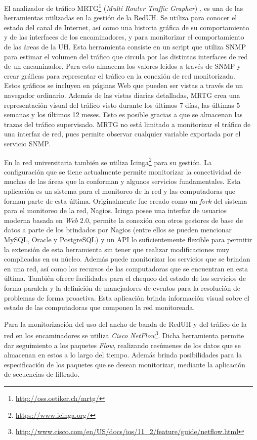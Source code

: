 El analizador de tráfico MRTG\footnote{\url{http://oss.oetiker.ch/mrtg/}}
(\emph{Multi Router Traffic Grapher})\cite{Prunoiu} , es una de las herramientas
utilizadas en la gestión de la RedUH. Se utiliza para conocer el estado del
canal de Internet, así como una historia gráfica de su comportamiento y de las
interfaces de los encaminadores, y para monitorizar el comportamiento de las
áreas de la UH. Esta herramienta consiste en un script que utiliza SNMP para
estimar el volumen del tráfico que circula por las distintas interfaces de red
de un encaminador. Para esto almacena los valores leídos a través de SNMP y
crear gráficas para representar el tráfico en la conexión de red monitorizada.
Estos gráficos se incluyen en páginas Web que pueden ser vistas a través de un
navegador ordinario. Además de las vistas diarias detalladas, MRTG crea una
representación visual del tráfico visto durante los últimos 7 días, las últimas
5 semanas y los últimos 12 meses. Esto es posible gracias a que se almacenan las
trazas del tráfico supervisado. MRTG no está limitado a monitorizar el tráfico
de una interfaz de red, pues permite observar cualquier variable exportada por
el servicio SNMP\cite{Hardaker2011}.

En la red universitaria también se utiliza Icinga\footnote{\url{https://www.icinga.org/}} para su gestión. La
configuración que se tiene actualmente permite monitorizar la conectividad de
muchas de las áreas que la conforman y algunos servicios fundamentales. Esta
aplicación es un sistema para el monitoreo de la red y las computadoras que
forman parte de esta última. Originalmente fue creado como un \textit{fork} del
sistema para el monitoreo de la red, Nagios. Icinga posee una interfaz de
usuarios moderna basada en \textit{Web} 2.0, permite la conexión con otros
gestores de base de datos a parte de los brindados por Nagios (entre ellos se
pueden mencionar MySQL, Oracle y PostgreSQL) y un API lo suficientemente
flexible para permitir la extensión de esta herramienta sin tener que realizar
modificaciones muy complicadas en su núcleo. Además puede monitorizar los
servicios que se brindan en una red, así como los recursos de las computadoras
que se encuentran en esta última. También ofrece facilidades para el chequeo del
estado de los servicios de forma paralela y la definición de manejadores de
eventos para la resolución de problemas de forma proactiva. Esta aplicación
brinda información visual sobre el estado de las computadoras que componen la
red monitoreada.

Para la monitorización del uso del ancho de banda de RedUH y del tráfico de la
red en los encaminadores se utiliza \textit{Cisco NetFlow}\footnote{\url{
http://www.cisco.com/en/US/docs/ios/11_2/feature/guide/netflow.html}}. Dicha
herramienta permite dar seguimiento a los paquetes
\textit{Flow}\cite{Brownlee1999, Rajahalme2004, Quittek2004}, realizando
resúmenes de los datos que se almacenan en estos a lo largo del tiempo. Además
brinda posibilidades para la especificación de los paquetes que se desean
monitorizar, mediante la aplicación de secuencias de filtrado. 

